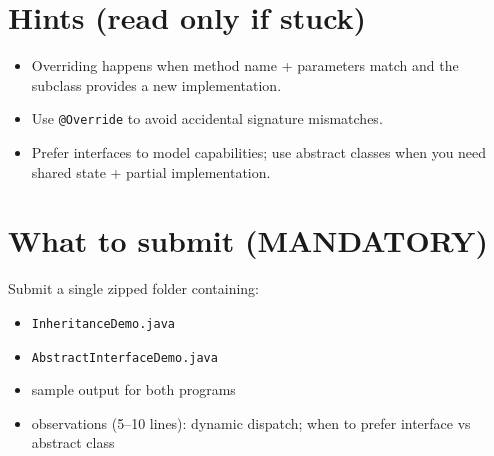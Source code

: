 \documentclass[11pt]{article}
\begin{document}
\section{Hints (read only if stuck)}
\begin{itemize}[leftmargin=*]
  \item Overriding happens when method name + parameters match and the subclass provides a new implementation.
  \item Use \texttt{@Override} to avoid accidental signature mismatches.
  \item Prefer interfaces to model capabilities; use abstract classes when you need shared state + partial implementation.
\end{itemize}

\section{What to submit (MANDATORY)}
Submit a single zipped folder containing:
\begin{itemize}[leftmargin=*]
  \item \texttt{InheritanceDemo.java}
  \item \texttt{AbstractInterfaceDemo.java}
  \item sample output for both programs
  \item observations (5--10 lines): dynamic dispatch; when to prefer interface vs abstract class
\end{itemize}

\notesources{\OOPSUnitIISources}
\end{document}

